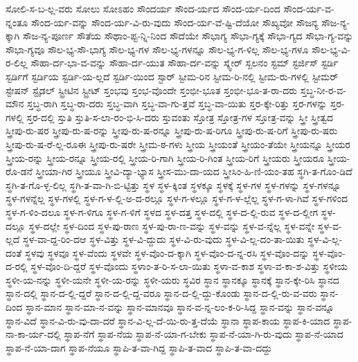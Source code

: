 {ಸೋಲಿ-ಸ-ಬ-ಲ್ಲ-ವರು
ಸೋಲು
ಸೋಽಹಂ
ಸೌಂದರ್ಯ
ಸೌಂದ-ರ್ಯದ
ಸೌಂದ-ರ್ಯ-ದಿಂದ
ಸೌಂದ-ರ್ಯ-ವ-ನ್ನಂತೂ
ಸೌಂದ-ರ್ಯ-ವನ್ನು
ಸೌಂದ-ರ್ಯ-ವಿ-ರು-ವುದು
ಸೌಂದ-ರ್ಯ-ವೆ-ಷ್ಟಿ-ದೆಯೋ
ಸೌಖ್ಯವೋ
ಸೌಜನ್ಯ
ಸೌಜ-ನ್ಯ-ಕ್ಕಾಗಿ
ಸೌಜ-ನ್ಯ-ಪೂರ್ಣ
ಸೌತೆಯ
ಸೌಥಾಂ-ಪ್ಟ-ನ್ನಿ-ನಿಂದ
ಸೌದೆಯೇ
ಸೌಭಾಗ್ಯ
ಸೌಭಾ-ಗ್ಯಕ್ಕೆ
ಸೌಭಾ-ಗ್ಯದ
ಸೌಭಾ-ಗ್ಯ-ವನ್ನು
ಸೌಭಾ-ಗ್ಯವೂ
ಸೌಲ-ಭ್ಯ-ಸೌ-ಭಾಗ್ಯ
ಸೌಲ-ಭ್ಯ-ಗಳ
ಸೌಲ-ಭ್ಯ-ಗಳನ್ನೂ
ಸೌಲ-ಭ್ಯ-ಗ-ಳಿಲ್ಲ
ಸೌಲ-ಭ್ಯ-ಗಳೂ
ಸೌಲ-ಭ್ಯ-ವಿ-ರ-ಲಿಲ್ಲ
ಸೌಹಾ-ರ್ದ-ಭಾ-ವ-ವನ್ನು
ಸೌಹಾ-ರ್ದ-ಯುತ
ಸೌಹಾ-ರ್ದ-ವನ್ನು
ಸ್ಕ್ವೇರ್
ಸ್ಖಲನಂ
ಸ್ಟಮ್
ಸ್ಟರ್ಜಿಸ್
ಸ್ಟರ್ಡಿ
ಸ್ಟರ್ಡಿಗೆ
ಸ್ಟರ್ಡಿಯ
ಸ್ಟರ್ಡಿ-ಯ-ಲ್ಲದೆ
ಸ್ಟರ್ಡಿ-ಯಿಂದ
ಸ್ಟಾರ್
ಸ್ಟೀಮ-ರಿನ
ಸ್ಟೀಮ-ರಿ-ನಲ್ಲಿ
ಸ್ಟೀಮ-ರು-ಗಳಲ್ಲಿ
ಸ್ಟೀಮರ್
ಸ್ಟೇಷನ್
ಸ್ಟೈಡಲ್
ಸ್ಟ್ರೀಟಿನ
ಸ್ಟ್ರೀಟ್
ಸ್ತಂಭವು
ಸ್ತಂಭ-ವೊಂದೇ
ಸ್ತಂಭೀ-ಭೂತ
ಸ್ತಂಭೀ-ಭೂ-ತ-ರಾ-ದರು
ಸ್ತಬ್ಧ-ನೀ-ರ-ವ-ಮೌನ
ಸ್ತಬ್ಧ-ರಾಗಿ
ಸ್ತಬ್ಧ-ರಾ-ದರು
ಸ್ತಬ್ಧ-ವಾಗಿ
ಸ್ತಬ್ಧ-ವಾ-ಗು-ತ್ತವೆ
ಸ್ತಬ್ಧ-ವಾ-ಯಿತು
ಸ್ತರ-ಕ್ಕೇ-ರಿತ್ತು
ಸ್ತರ-ಗಳನ್ನು
ಸ್ತರ-ಗಳಲ್ಲಿ
ಸ್ತರ-ದಲ್ಲಿ
ಸ್ತುತಿ
ಸ್ತುತಿ-ಸ-ಲಾ-ರಂ-ಭಿ-ಸಿ-ದರು
ಸ್ತುವಂತು
ಸ್ತೋತ್ರ
ಸ್ತೋತ್ರ-ಗಳ
ಸ್ತೋತ್ರ-ವನ್ನು
ಸ್ತ್ರೀ
ಸ್ತ್ರೀತ್ವದ
ಸ್ತ್ರೀಪು-ರು-ಷರ
ಸ್ತ್ರೀಪು-ರು-ಷ-ರನ್ನು
ಸ್ತ್ರೀಪು-ರು-ಷ-ರನ್ನೂ
ಸ್ತ್ರೀಪು-ರು-ಷ-ರಿಗೂ
ಸ್ತ್ರೀಪು-ರು-ಷ-ರಿಗೆ
ಸ್ತ್ರೀಪು-ರು-ಷರು
ಸ್ತ್ರೀಪು-ರು-ಷ-ರೆ-ಲ್ಲ-ರೂಈ
ಸ್ತ್ರೀಪು-ರು-ಷರೇ
ಸ್ತ್ರೀಮ-ಠ-ಗಳು
ಸ್ತ್ರೀಯ
ಸ್ತ್ರೀಯಂತೆ
ಸ್ತ್ರೀಯಂ-ತೆಯೇ
ಸ್ತ್ರೀಯನ್ನೂ
ಸ್ತ್ರೀಯರ
ಸ್ತ್ರೀಯ-ರನ್ನು
ಸ್ತ್ರೀಯ-ರನ್ನೂ
ಸ್ತ್ರೀಯ-ರಲ್ಲಿ
ಸ್ತ್ರೀಯ-ರಿ-ಗಾಗಿ
ಸ್ತ್ರೀಯ-ರಿ-ಗಿಂತ
ಸ್ತ್ರೀಯ-ರಿಗೆ
ಸ್ತ್ರೀಯರು
ಸ್ತ್ರೀಯರೂ
ಸ್ತ್ರೀಯ-ರೊ-ಡನೆ
ಸ್ತ್ರೀಯಾ-ಗಿರ
ಸ್ತ್ರೀಯೂ
ಸ್ತ್ರೀವಿ-ದ್ಯಾ-ಭ್ಯಾಸ
ಸ್ತ್ರೀಸ-ಮು-ದಾ-ಯದ
ಸ್ತ್ರೀಸಿಂ-ಹಿ-ಣಿ-ಯಂ-ತಹ
ಸ್ಥಗಿ-ತ-ಗೊಂ-ಡಿದೆ
ಸ್ಥಗಿ-ತ-ಗೊ-ಳ್ಳ-ಲಿಲ್ಲ
ಸ್ಥಗಿ-ತ-ವಾ-ಗಿ-ಬಿ-ಟ್ಟಿತ್ತು
ಸ್ಥಳ
ಸ್ಥಳ-ಕ್ಕಿಂತ
ಸ್ಥಳಕ್ಕೂ
ಸ್ಥಳಕ್ಕೆ
ಸ್ಥಳ-ಗಳ
ಸ್ಥಳ-ಗಳನ್ನು
ಸ್ಥಳ-ಗಳನ್ನೂ
ಸ್ಥಳ-ಗಳನ್ನೆಲ್ಲ
ಸ್ಥಳ-ಗಳಲ್ಲಿ
ಸ್ಥಳ-ಗ-ಳ-ಲ್ಲಿ-ಅ-ದ-ರಲ್ಲೂ
ಸ್ಥಳ-ಗ-ಳಲ್ಲೂ
ಸ್ಥಳ-ಗ-ಳ-ಲ್ಲೆಲ್ಲ
ಸ್ಥಳ-ಗ-ಳಾ-ಗಿವೆ
ಸ್ಥಳ-ಗಳಿಂದ
ಸ್ಥಳ-ಗ-ಳಿಂ-ದಲೂ
ಸ್ಥಳ-ಗ-ಳಿಗೂ
ಸ್ಥಳ-ಗ-ಳಿಗೆ
ಸ್ಥಳದ
ಸ್ಥಳ-ದತ್ತ
ಸ್ಥಳ-ದಲ್ಲಿ
ಸ್ಥಳ-ದ-ಲ್ಲಿ-ರುವ
ಸ್ಥಳ-ದ-ಲ್ಲೀಗ
ಸ್ಥಳ-ದಲ್ಲೂ
ಸ್ಥಳ-ದಲ್ಲೇ
ಸ್ಥಳ-ದಿಂದ
ಸ್ಥಳ-ಪು-ರಾಣ
ಸ್ಥಳ-ಪು-ರಾ-ಣ-ವನ್ನು
ಸ್ಥಳ-ವನ್ನು
ಸ್ಥಳ-ವ-ನ್ನೆಲ್ಲ
ಸ್ಥಳ-ವನ್ನೇ
ಸ್ಥಳ-ವ-ಲ್ಲದೆ
ಸ್ಥಳ-ವಾ-ದ್ದ-ರಿಂ-ದಆ
ಸ್ಥಳ-ವಿತ್ತು
ಸ್ಥಳ-ವಿ-ದ್ದುದು
ಸ್ಥಳ-ವಿ-ರು-ವುದು
ಸ್ಥಳ-ವಿ-ಲ್ಲ-ದಂ-ತಾ-ಯಿತು
ಸ್ಥಳ-ವಿ-ಲ್ಲ-ದಂತೆ
ಸ್ಥಳವು
ಸ್ಥಳವೂ
ಸ್ಥಳ-ವೆಂದು
ಸ್ಥಳವೇ
ಸ್ಥಳ-ವೊಂ-ದ-ಕ್ಕಾಗಿ
ಸ್ಥಳ-ವೊಂ-ದ-ನ್ನ-ರಸಿ
ಸ್ಥಳ-ವೊಂ-ದನ್ನು
ಸ್ಥಳ-ವೊಂ-ದ-ರಲ್ಲಿ
ಸ್ಥಳ-ವೊಂ-ದಿ-ದ್ದರೆ
ಸ್ಥಳ-ವೊಂದು
ಸ್ಥಳಾಂ-ತ-ರಿ-ಸ-ಲಾ-ಯಿತು
ಸ್ಥಳಾ-ವ-ಕಾಶ
ಸ್ಥಳಾ-ವ-ಕಾ-ಶ-ವಿತ್ತು
ಸ್ಥಳೀಯ
ಸ್ಥಳೀ-ಯ-ನನ್ನು
ಸ್ಥಳೀ-ಯನೇ
ಸ್ಥಳೀ-ಯ-ರನ್ನು
ಸ್ಥಳೀ-ಯರು
ಸ್ಥವಿರ
ಸ್ಥಾನ
ಸ್ಥಾನಕ್ಕೂ
ಸ್ಥಾನಕ್ಕೆ
ಸ್ಥಾನ-ಕ್ಕೇ-ರಿಸಿ
ಸ್ಥಾನದ
ಸ್ಥಾನ-ದಲ್ಲಿ
ಸ್ಥಾನ-ದ-ಲ್ಲಿ-ದ್ದರೆ
ಸ್ಥಾನ-ದ-ಲ್ಲಿ-ದ್ದ-ವರೂ
ಸ್ಥಾನ-ದ-ಲ್ಲಿ-ದ್ದು-ಕೊಂಡು
ಸ್ಥಾನ-ದ-ಲ್ಲಿ-ರು-ವ-ವರು
ಸ್ಥಾನ-ದಿಂದ
ಸ್ಥಾನ-ಮಾನ
ಸ್ಥಾನ-ಮಾ-ನ-ವನ್ನು
ಸ್ಥಾನ-ಮಾನವೂ
ಸ್ಥಾನ-ವ-ನ್ನ-ಲಂ-ಕ-ರಿ-ಸಿದ್ದ
ಸ್ಥಾನ-ವನ್ನು
ಸ್ಥಾನ-ವನ್ನೂ
ಸ್ಥಾನ-ವಿದೆ
ಸ್ಥಾನ-ವಿ-ರು-ವು-ದಾ-ದರೆ
ಸ್ಥಾನ-ವಿ-ಲ್ಲ-ದೆ-ಯಿ-ರು-ತ್ತ-ದೆಯೆ
ಸ್ಥಾನಾ
ಸ್ಥಾಪ-ಕಾಯ
ಸ್ಥಾಪ-ಕಿ-ಯಾದ
ಸ್ಥಾಪ-ನಾ-ಕಾ-ರ್ಯ-ದಲ್ಲಿ
ಸ್ಥಾಪ-ನೆಗೆ
ಸ್ಥಾಪ-ನೆಯ
ಸ್ಥಾಪ-ನೆ-ಯಾ-ಗ-ಬೇಕು
ಸ್ಥಾಪ-ನೆ-ಯಾ-ಗಿ-ರು-ವುದು
ಸ್ಥಾಪ-ನೆ-ಯಾದ
ಸ್ಥಾಪ-ನೆ-ಯಾ-ದಾಗ
ಸ್ಥಾಪ-ನೆಯೂ
ಸ್ಥಾಪಿ-ತ-ವಾ-ಗಿದ್ದ
ಸ್ಥಾಪಿ-ತ-ವಾದ
ಸ್ಥಾಪಿ-ತ-ವಾ-ದದ್ದು
}
